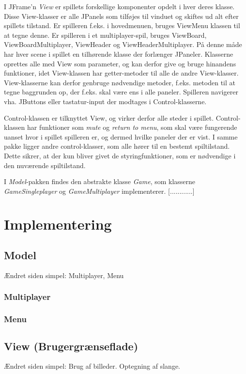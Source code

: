 \documentclass{report}
\begin{document}
I JFrame'n \textit{View} er spillets forskellige komponenter opdelt i hver deres klasse. Disse View-klasser er alle JPanels som tilføjes til vinduet og skiftes ud alt efter spillets tilstand. Er spilleren f.eks. i hovedmenuen, bruges ViewMenu klassen til at tegne denne. Er spilleren i et multiplayer-spil, bruges ViewBoard, ViewBoardMultiplayer, ViewHeader og ViewHeaderMultiplayer. På denne måde har hver scene i spillet en tilhørende klasse der forlænger JPaneler. Klasserne oprettes alle med View som parameter, og kan derfor give og bruge hinandens funktioner, idet View-klassen har getter-metoder til alle de andre View-klasser. View-klasserne kan derfor genbruge nødvendige metoder, f.eks. metoden til at tegne baggrunden op, der f.eks. skal være ens i alle paneler. Spilleren navigerer vha. JButtons eller tastatur-input der modtages i Control-klasserne.

Control-klassen er tilknyttet View, og virker derfor alle steder i spillet. Control-klassen har funktioner som \textit{mute} og \textit{return to menu}, som skal være fungerende uanset hvor i spillet spilleren er, og dermed hvilke paneler der er vist. I samme pakke ligger andre control-klasser, som alle hører til en bestemt spiltilstand. Dette sikrer, at der kun bliver givet de styringfunktioner, som er nødvendige i den nuværende spiltilstand.

I \textit{Model}-pakken findes den abstrakte klasse \textit{Game}, som klasserne \textit{GameSingleplayer} og \textit{GameMultiplayer} implementerer. [............]

\section{Implementering}
\subsection{Model}
Ændret siden simpel: Multiplayer, Menu
\subsubsection{Multiplayer}

\subsubsection{Menu}


\subsection{View (Brugergrænseflade)}
Ændret siden simpel: Brug af billeder. Optegning af slange.
\end{document}
